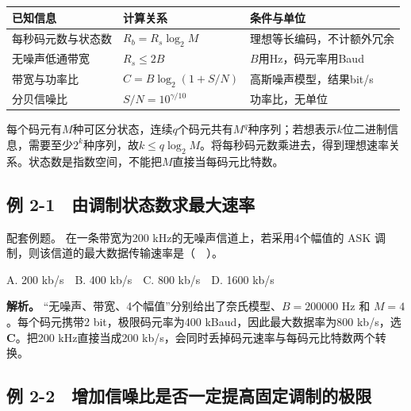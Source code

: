 \begin{wideblock}

\par\medskip\noindent\begin{minipage}{\linewidth}\fontsize{9.3}{12}\selectfont\begin{tabularx}{\linewidth}{@{}YYY@{}}
\toprule\noalign{}
已知信息 & 计算关系 & 条件与单位 \\
\midrule\noalign{}


每秒码元数与状态数 & \(R_b=R_s\log_2M\) & 理想等长编码，不计额外冗余 \\
无噪声低通带宽 & \(R_s\le2B\) & \(B\)用Hz，码元率用Baud \\
带宽与功率比 & \(C=B\log_2(1+S/N)\) & 高斯噪声模型，结果bit/s \\
分贝信噪比 & \(S/N=10^{\gamma/10}\) & 功率比，无单位 \\
\bottomrule\end{tabularx}
\end{minipage}\par\medskip

\end{wideblock}

每个码元有\(M\)种可区分状态，连续\(q\)个码元共有\(M^q\)种序列；若想表示\(k\)位二进制信息，需要至少\(2^k\)种序列，故\(k\le q\log_2M\)。将每秒码元数乘进去，得到理想速率关系。状态数是指数空间，不能把\(M\)直接当每码元比特数。

\subsection{例 2-1　由调制状态数求最大速率}\label{CN02-ex1}

\begin{example}[配套例题]

配套例题。 在一条带宽为200 kHz的无噪声信道上，若采用4个幅值的 ASK 调制，则该信道的最大数据传输速率是（　）。

A. 200 kb/s　B. 400 kb/s　C. 800 kb/s　D. 1600 kb/s

\end{example}

\textbf{解析。} ``无噪声、带宽、4个幅值''分别给出了奈氏模型、\(B=200000\) Hz 和 \(M=4\)。每个码元携带2 bit，极限码元率为400 kBaud，因此最大数据率为800 kb/s，选 \textbf{C}。把200 kHz直接当成200 kb/s，会同时丢掉码元速率与每码元比特数两个转换。

\subsection{例 2-2　增加信噪比是否一定提高固定调制的极限}\label{CN02-ex2}

